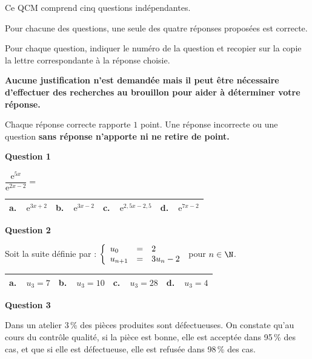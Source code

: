 \medskip

Ce QCM comprend cinq questions indépendantes.

Pour chacune des questions, une seule des quatre réponses proposées est correcte.

Pour chaque question, indiquer le numéro de la question et recopier sur la copie la lettre correspondante à la réponse choisie.

\textbf{Aucune justification n'est demandée mais il peut être nécessaire d'effectuer des recherches au brouillon pour aider à déterminer votre réponse.}

Chaque réponse correcte rapporte $1$ point. Une réponse incorrecte ou une question \textbf{sans réponse n'apporte ni ne retire de point.}

\medskip

\textbf{Question 1}

$\dfrac{\text{e}^{5x}}{\text{e}^{2x - 2}} = $

\begin{center}
\begin{tabularx}{\linewidth}{|*{4}{X|}}\hline
\textbf{a.~~}$\text{e}^{3x + 2}$&\textbf{b.~~}$\text{e}^{3x - 2}$&\textbf{c.~~}$\text{e}^{2,5x - 2,5}$&\textbf{d.~~}$\text{e}^{7x - 2}$\\ \hline
\end{tabularx}
\end{center}

\medskip

\textbf{Question 2}

Soit la suite définie par : $\left\{\begin{array}{l c l}
u_0&=&2\\u_{n+1} &=& 3u_n - 2
\end{array}\right.$ pour $n \in \N$.

\begin{center}
\begin{tabularx}{\linewidth}{|*{4}{X|}}\hline
\textbf{a.~~}$u_3 = 7$&\textbf{b.~~}$u_3 = 10$&\textbf{c.~~}$u_3 = 28$&\textbf{d.~~}$u_3 = 4$\\ \hline
\end{tabularx}
\end{center}
 
\medskip

\textbf{Question 3}

Dans un atelier 3\,\% des pièces produites sont défectueuses. On constate qu'au cours du
contrôle qualité, si la pièce est bonne, elle est acceptée dans 95\,\% des cas, et que si elle est défectueuse, elle est refusée dans 98\,\% des cas.


